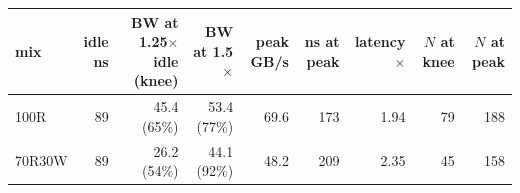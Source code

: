 \begin{tabular}{lrrrrrrrr}
\toprule
mix & idle ns & BW at 1.25$\times$ idle (knee) & BW at 1.5$\times$ & peak GB/s & ns at peak & latency $\times$ & $N$ at knee & $N$ at peak \\
\midrule
100R & 89 & 45.4 (65\%) & 53.4 (77\%) & 69.6 & 173 & 1.94 & 79 & 188 \\
70R30W & 89 & 26.2 (54\%) & 44.1 (92\%) & 48.2 & 209 & 2.35 & 45 & 158 \\
\bottomrule
\end{tabular}
